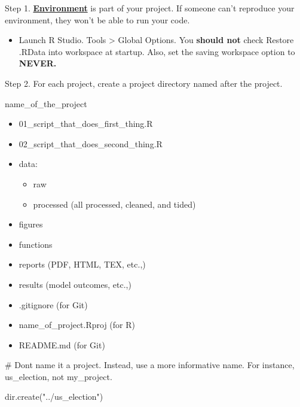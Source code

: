 \documentclass[
  letterpaper,
  DIV=11,
  numbers=noendperiod]{scrreprt}
\newenvironment{Shaded}{\begin{snugshade}}{\end{snugshade}}
\newcommand{\CommentTok}[1]{\textcolor[rgb]{0.37,0.37,0.37}{#1}}
\newcommand{\FunctionTok}[1]{\textcolor[rgb]{0.28,0.35,0.67}{#1}}
\newcommand{\NormalTok}[1]{\textcolor[rgb]{0.00,0.23,0.31}{#1}}
\newcommand{\StringTok}[1]{\textcolor[rgb]{0.13,0.47,0.30}{#1}}
\providecommand{\tightlist}{%
  \setlength{\itemsep}{0pt}\setlength{\parskip}{0pt}}\usepackage{longtable,booktabs,array}
\begin{document}
Step 1. \href{https://environments.rstudio.com/}{\textbf{Environment}}
is part of your project. If someone can't reproduce your environment,
they won't be able to run your code.

\begin{itemize}
\tightlist
\item
  Launch R Studio. Tools \textgreater{} Global Options. You
  \textbf{should not} check Restore .RData into workspace at startup.
  Also, set the saving workspace option to \textbf{NEVER.}
\end{itemize}

Step 2. For each project, create a project directory named after the
project.

name\_of\_the\_project

\begin{itemize}
\tightlist
\item
  01\_script\_that\_does\_first\_thing.R
\item
  02\_script\_that\_does\_second\_thing.R
\item
  data:

  \begin{itemize}
  \tightlist
  \item
    raw
  \item
    processed (all processed, cleaned, and tided)
  \end{itemize}
\item
  figures
\item
  functions
\item
  reports (PDF, HTML, TEX, etc.,)
\item
  results (model outcomes, etc.,)
\item
  .gitignore (for Git)
\item
  name\_of\_project.Rproj (for R)
\item
  README.md (for Git)
\end{itemize}

\begin{Shaded}
\begin{Highlighting}[]
\CommentTok{\# Don\textquotesingle{}t name it a project. Instead, use a more informative name. For instance, \textasciigrave{}us\_election\textasciigrave{}, not \textasciigrave{}my\_project.\textasciigrave{}}

\FunctionTok{dir.create}\NormalTok{(}\StringTok{"../us\_election"}\NormalTok{)}
\end{Highlighting}
\end{Shaded}
\end{document}
